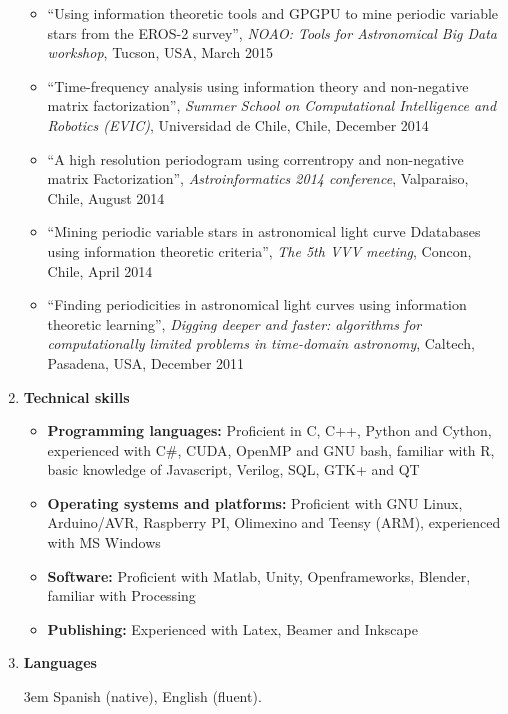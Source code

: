 \documentclass[letterpaper,11pt]{article}
\newcommand{\compactlist}{\setlength{\parskip}{0pt} \setlength{\leftskip}{2em}}
\begin{document}
\begin{enumerate}[I]
\begin{itemize}
        \item ``Using information theoretic tools and GPGPU to mine periodic variable stars from the EROS-2 survey'', \emph{NOAO: Tools for Astronomical Big Data workshop}, Tucson, USA, March 2015
        \item ``Time-frequency analysis using information theory and non-negative matrix factorization'', \emph{Summer School on Computational Intelligence and Robotics (EVIC)}, Universidad de Chile, Chile, December 2014
        \item ``A high resolution periodogram using correntropy and non-negative matrix Factorization'', \emph{Astroinformatics 2014 conference}, Valparaiso, Chile, August 2014
        \item ``Mining periodic variable stars in astronomical light curve Ddatabases using information theoretic criteria'', \emph{The 5th VVV meeting}, Concon, Chile, April 2014
        \item ``Finding periodicities in astronomical light curves using information theoretic learning'', \emph{Digging deeper and faster: algorithms for computationally limited problems in time-domain astronomy}, Caltech, Pasadena, USA, December 2011
        \end{itemize}
        
	\item \textbf{Technical skills}
		\begin{itemize} \compactlist
			\item \textbf{Programming languages:} Proficient in C, C++,  Python and Cython, experienced with C\#, CUDA, OpenMP and GNU bash, familiar with R, basic knowledge of Javascript, Verilog, SQL, GTK+ and QT
			\item \textbf{Operating systems and platforms:} Proficient with GNU Linux, Arduino/AVR, Raspberry PI, Olimexino and Teensy (ARM), experienced with MS Windows 
			\item \textbf{Software:} Proficient with Matlab, Unity, Openframeworks, Blender, familiar with Processing
			\item \textbf{Publishing:} Experienced with Latex, Beamer and Inkscape
		\end{itemize}
        
	
	\item \textbf{Languages} 
	
	{\leftskip 3em  Spanish (native), English (fluent). \par }
	
	

\end{enumerate}
\end{document}
